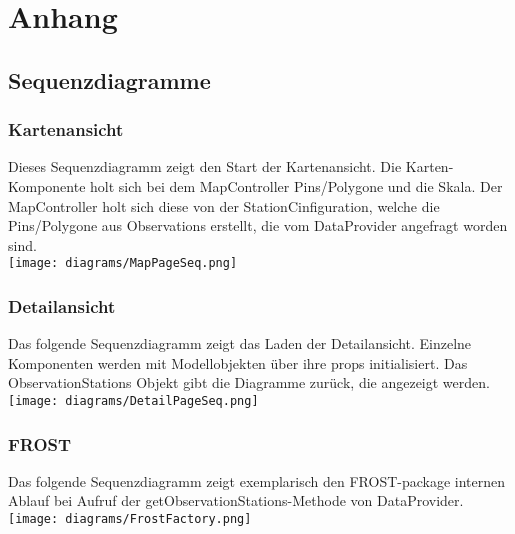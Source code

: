 \section{Anhang}
\subsection{Sequenzdiagramme}
\subsubsection*{Kartenansicht}
Dieses Sequenzdiagramm zeigt den Start der \gls{Kartenansicht}. Die Karten-Komponente holt sich bei dem MapController Pins/Polygone und die Skala. 
Der MapController holt sich diese von der StationCinfiguration, welche die Pins/Polygone aus Observations erstellt, die vom DataProvider angefragt worden sind.
\\
\texttt{[image: diagrams/MapPageSeq.png]}

\newpage
\subsubsection*{Detailansicht}
Das folgende Sequenzdiagramm zeigt das Laden der \gls{Detailansicht}. Einzelne Komponenten werden mit Modellobjekten über ihre props initialisiert. Das ObservationStations Objekt gibt die Diagramme zurück, die angezeigt werden.\\


\texttt{[image: diagrams/DetailPageSeq.png]}

\newpage
\subsubsection*{FROST}
Das folgende Sequenzdiagramm zeigt exemplarisch den FROST-package internen Ablauf bei Aufruf der getObservationStations-Methode von DataProvider.\\


\texttt{[image: diagrams/FrostFactory.png]}
